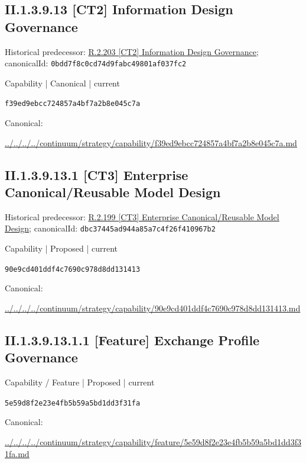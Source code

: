\documentclass[10pt,a4paper]{article}
\begin{document}
\subsection*{II.1.3.9.13 [CT2] Information Design Governance}
Historical predecessor: \hyperref[element-0bdd7f8c0cd74d9fabc49801af037fc2]{R.2.203 [CT2] Information Design Governance}; canonicalId: \texttt{0bdd7f8c0cd74d9fabc49801af037fc2}\par
\label{element-f39ed9ebcc724857a4bf7a2b8e045c7a}
{\small Capability | Canonical | current}\par
\texttt{f39ed9ebcc724857a4bf7a2b8e045c7a}\par
Canonical: \par
{\footnotesize\url{../../../../continuum/strategy/capability/f39ed9ebcc724857a4bf7a2b8e045c7a.md}}\par
\subsection*{II.1.3.9.13.1 [CT3] Enterprise Canonical/Reusable Model Design}
Historical predecessor: \hyperref[element-dbc37445ad944a85a7c4f26f410967b2]{R.2.199 [CT3] Enterprise Canonical/Reusable Model Design}; canonicalId: \texttt{dbc37445ad944a85a7c4f26f410967b2}\par
\label{element-90e9cd401ddf4c7690c978d8dd131413}
{\small Capability | Proposed | current}\par
\texttt{90e9cd401ddf4c7690c978d8dd131413}\par
Canonical: \par
{\footnotesize\url{../../../../continuum/strategy/capability/90e9cd401ddf4c7690c978d8dd131413.md}}\par
\subsection*{II.1.3.9.13.1.1 [Feature] Exchange Profile Governance}
\label{element-5e59d8f2e23e4fb5b59a5bd1dd3f31fa}
{\small Capability / Feature | Proposed | current}\par
\texttt{5e59d8f2e23e4fb5b59a5bd1dd3f31fa}\par
Canonical: \par
{\footnotesize\url{../../../../continuum/strategy/capability/feature/5e59d8f2e23e4fb5b59a5bd1dd3f31fa.md}}\par
\end{document}
